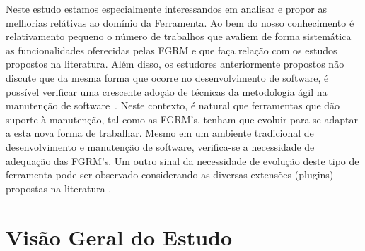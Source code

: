 

Neste estudo estamos especialmente interessandos em analisar e propor as melhorias relátivas ao
domínio da Ferramenta. Ao bem do nosso conhecimento é relativamento pequeno o número de trabalhos
que avaliem de forma sistemática as funcionalidades oferecidas pelas FGRM e que faça relação com os
estudos propostos na literatura. Além disso, os estudores anteriormente propostos não discute que da
mesma forma que ocorre no desenvolvimento de software, é possível verificar uma crescente adoção de
técnicas da metodologia ágil na manutenção de software~\cite{Soltan2016,Devulapally2015,
	Heeager2015}. Neste contexto, é natural que ferramentas que dão suporte à manutenção, tal como
as FGRM's, tenham que evoluir para se adaptar a esta nova forma de trabalhar. Mesmo em um ambiente
tradicional de  desenvolvimento e manutenção de software, verifica-se a necessidade de adequação das
FGRM's. Um outro sinal da necessidade de evolução deste tipo de ferramenta pode ser observado
considerando as diversas extensões (plugins) propostas na literatura
\cite{101186,Thung:2014:BIT:2635868.2661678,Kononenko:2014:DED:2591062.2591075}.

\section{Visão Geral do Estudo}
\label{sec:intro-visao-geral}


